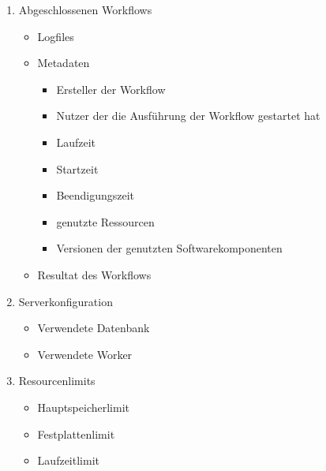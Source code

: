 \begin{enumerate}
    \item Abgeschlossenen \glspl{Workflow}
    \begin{itemize}
        \setlength\itemsep{-1em}
        \item Logfiles
        \item Metadaten
        \begin{itemize}
            \setlength\itemsep{-1em}
            \item Ersteller der \gls{Workflow}
            \item Nutzer der die Ausführung der \gls{Workflow} gestartet hat
            \item Laufzeit
            \item Startzeit
            \item Beendigungszeit
            \item genutzte Ressourcen
            \item Versionen der genutzten Softwarekomponenten
        \end{itemize}
        \item Resultat des Workflows
    \end{itemize}
    \newpage
    \item Serverkonfiguration
    \begin{itemize}
        \setlength\itemsep{-1em}
        \item Verwendete Datenbank
        \item Verwendete Worker
    \end{itemize}
    
    \item Resourcenlimits
    \begin{itemize}
        \setlength\itemsep{-1em}
        \item Hauptspeicherlimit
        \item Festplattenlimit
        \item Laufzeitlimit
    \end{itemize}
 \end{enumerate}